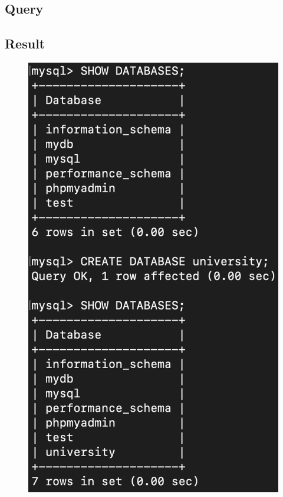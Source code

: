 \documentclass[12pt]{article}
\begin{document}
\subsection{Query}

\subsection{Result}
\begin{figure}[!hbt]
    \centering
    \includegraphics[scale=0.7]{screenshots/2.png}
    \label{fig:my_label1}
\end{figure}
\end{document}
